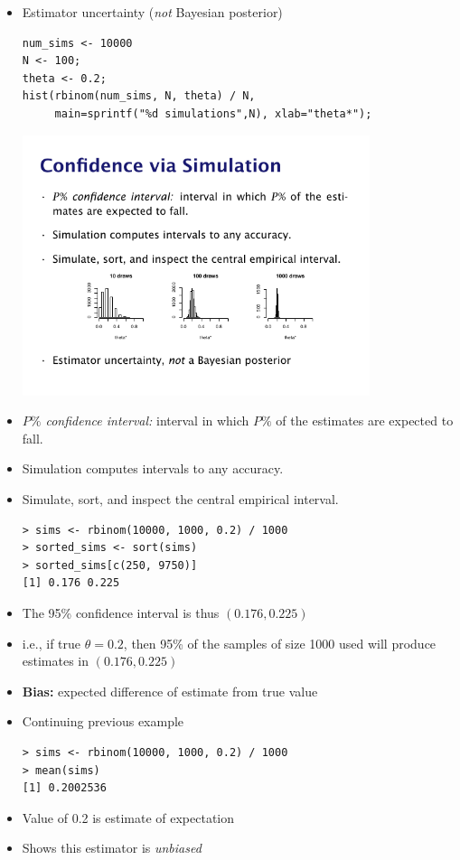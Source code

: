 \documentclass[10pt]{report}
\begin{document}
%
\begin{itemize}
\item Estimator uncertainty (\emph{not} Bayesian posterior)
{\small
\begin{Verbatim}
num_sims <- 10000
N <- 100;  
theta <- 0.2;
hist(rbinom(num_sims, N, theta) / N,
     main=sprintf("%d simulations",N), xlab="theta*");
\end{Verbatim}
}
\vspace*{-12pt}
\begin{center}
\includegraphics[width=0.8\textwidth]{img/hist-10-100-1000.pdf}
\end{center}
\end{itemize}


%
\begin{itemize}
\item \emph{$P\%$ confidence interval:}  interval in which $P\%$ of the estimates are
expected to fall.
\item Simulation computes intervals to any accuracy.
\item Simulate, sort, and inspect the central empirical interval.
{\small
\begin{Verbatim}
> sims <- rbinom(10000, 1000, 0.2) / 1000
> sorted_sims <- sort(sims)
> sorted_sims[c(250, 9750)]
[1] 0.176 0.225
\end{Verbatim}
}
\item The 95\% confidence interval is thus $(0.176,0.225)$
\item i.e., if true $\theta = 0.2$, then 95\% of the samples of
  size 1000 used will produce estimates in $(0.176,0.225)$
\end{itemize}


%
\begin{itemize}
\item {\bfseries Bias:} expected difference of estimate from true value
\item Continuing previous example
{\small
\begin{Verbatim}
> sims <- rbinom(10000, 1000, 0.2) / 1000
> mean(sims)
[1] 0.2002536
\end{Verbatim}
}
\item Value of 0.2 is estimate of expectation
\item Shows this estimator is \emph{unbiased}
\end{itemize}
\end{document}
